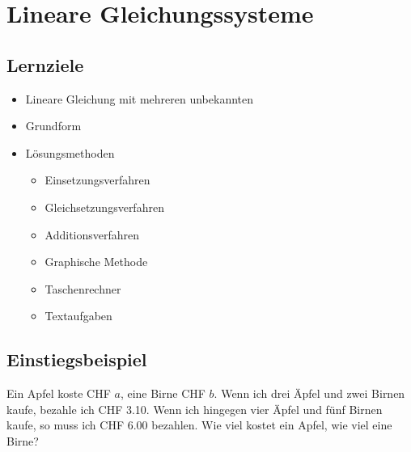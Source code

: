 \section{Lineare Gleichungssysteme}

\subsection*{Lernziele}
\begin{itemize}
	\item{Lineare Gleichung mit mehreren unbekannten}
	\item{Grundform}
	\item{Lösungsmethoden}
	\begin{itemize}
		\item{Einsetzungsverfahren}
		\item{Gleichsetzungsverfahren}
		\item{Additionsverfahren}
		\item{Graphische Methode}
		\item{Taschenrechner}
    \item Textaufgaben
	\end{itemize}

\end{itemize}

\newpage


\subsection{Einstiegsbeispiel}
Ein Apfel koste CHF $a$, eine Birne CHF $b$. Wenn ich drei Äpfel und zwei Birnen kaufe, bezahle ich CHF 3.10. Wenn ich hingegen vier Äpfel und fünf Birnen kaufe, so muss ich CHF 6.00 bezahlen. Wie viel kostet ein Apfel, wie viel eine Birne?




